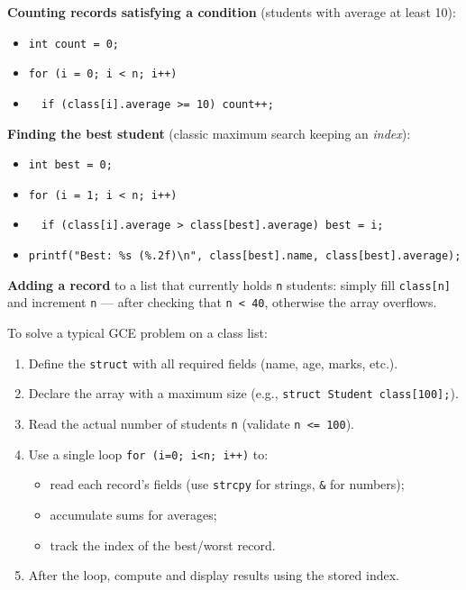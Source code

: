 \documentclass[11pt]{article}
\begin{document}
\textbf{Counting records satisfying a condition} (students with average at least 10):
\begin{itemize}
\item[] \texttt{int count = 0;}
\item[] \texttt{for (i = 0; i < n; i++)}
\item[] \texttt{\ \ if (class[i].average >= 10) count++;}
\end{itemize}

\textbf{Finding the best student} (classic maximum search keeping an \emph{index}):
\begin{itemize}
\item[] \texttt{int best = 0;}
\item[] \texttt{for (i = 1; i < n; i++)}
\item[] \texttt{\ \ if (class[i].average > class[best].average) best = i;}
\item[] \texttt{printf("Best: \%s (\%.2f)\textbackslash n", class[best].name, class[best].average);}
\end{itemize}

\textbf{Adding a record} to a list that currently holds \texttt{n} students: simply fill \texttt{class[n]} and increment \texttt{n} --- after checking that \texttt{n < 40}, otherwise the array overflows.

\begin{methode}
To solve a typical GCE problem on a class list:
\begin{enumerate}
\item Define the \texttt{struct} with all required fields (name, age, marks, etc.).
\item Declare the array with a maximum size (e.g., \texttt{struct Student class[100];}).
\item Read the actual number of students \texttt{n} (validate \texttt{n <= 100}).
\item Use a single loop \texttt{for (i=0; i<n; i++)} to:
  \begin{itemize}
  \item read each record's fields (use \texttt{strcpy} for strings, \texttt{\&} for numbers);
  \item accumulate sums for averages;
  \item track the index of the best/worst record.
  \end{itemize}
\item After the loop, compute and display results using the stored index.
\end{enumerate}
\end{methode}
\end{document}
